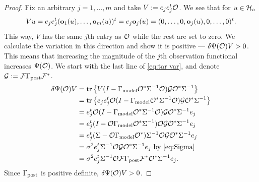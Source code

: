 \documentclass{amsart}
\numberwithin{equation}{section}
\begin{document}
\biggerbetter
\begin{proof} 
  Fix an arbitrary $j=1,\dots,m$ and take $V:= e_j e_j^t \mathcal{O}$. We see
  that for $u \in \mathcal{H}_o$
  \begin{equation*}
    Vu = e_je_j^t (\mathbf{o}_1(u),\dots,\mathbf{o}_m(u) )^t = e_j \mathbf{o}_j(u)
    = (0,\dots,0,\mathbf{o}_j(u),0,\dots,0)^t.
  \end{equation*}
  This way, $V$ has the same $j$th entry as $\mathcal{O}$ while the rest are
  set to zero. We calculate the variation in this direction and show
  it is positive --- $\delta \Psi(\mathcal{O})V > 0$. This means that
  increasing the magnitude of the $j$th observation functional
  increases $\Psi(\mathcal{O})$. We start with the last line of \eqref{eq:tar var}, and denote $\mathcal{G} : = \mathcal{F} \Gamma_{\textup{post}} \mathcal{F}^*$.
  \begin{align*}
     \delta \Psi(\mathcal{O}) V 
    &= \textup{tr}\left \{V ( I - \Gamma_{\textup{model}} \mathcal{O}^*\Sigma^{-1}\mathcal{O}) \mathcal{G} \mathcal{O}^* \Sigma^{-1} \right \} \\
    &= \textup{tr}\left \{e_je_j^t \mathcal{O} ( I - \Gamma_{\textup{model}} \mathcal{O}^*\Sigma^{-1}\mathcal{O}) \mathcal{G} \mathcal{O}^* \Sigma^{-1} \right \} \\
    &= e_j^t \mathcal{O} ( I - \Gamma_{\textup{model}} \mathcal{O}^*\Sigma^{-1}\mathcal{O}) \mathcal{G} \mathcal{O}^* \Sigma^{-1}e_j \\
    &= e_j^t ( I - \mathcal{O} \Gamma_{\textup{model}} \mathcal{O}^*\Sigma^{-1})\mathcal{O} \mathcal{G} \mathcal{O}^* \Sigma^{-1}e_j \\  
    &=  e_j^t(\Sigma-\mathcal{O} \Gamma_{\textup{model}} \mathcal{O}^*) \Sigma^{-1}\mathcal{O} \mathcal{G} \mathcal{O}^* \Sigma^{-1}e_j \\
    &=\sigma^2 e_j^t \Sigma^{-1}\mathcal{O} \mathcal{G} \mathcal{O}^* \Sigma^{-1}e_j
    \text{ by \eqref{eq:Sigma} }\\
    &=\sigma^2 e_j^t \Sigma^{-1}\mathcal{O} \mathcal{F} \Gamma_{\textup{post}} \mathcal{F}^* \mathcal{O}^* \Sigma^{-1}e_j.
  \end{align*} 
  Since $\Gamma_{\textup{post}}$ is positive definite, $\delta \Psi(\mathcal{O}) V > 0$.
\end{proof}





\end{document}
